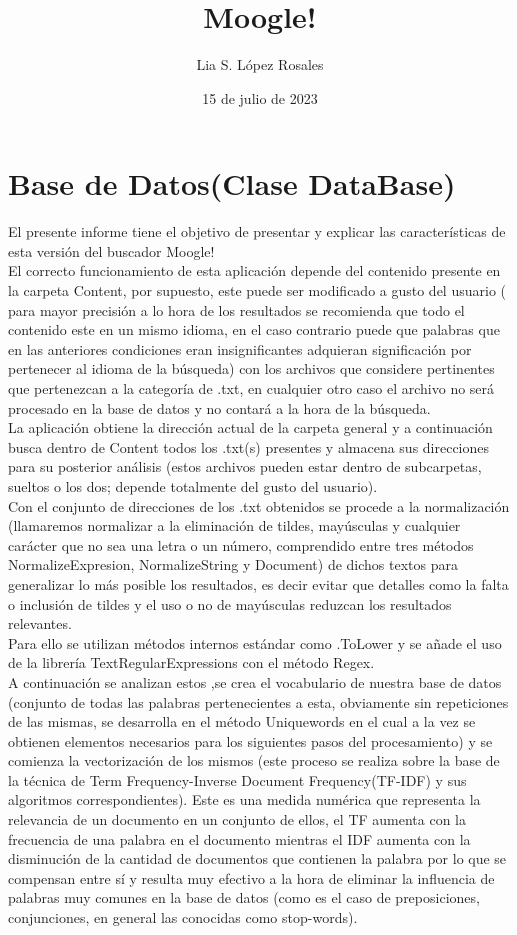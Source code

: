 \documentclass[options]{article}
\title{Moogle!}
\author{Lia S. López Rosales}
\date{15 de julio de 2023}
\begin{document}
\maketitle
\section{Base de Datos(Clase DataBase)}
El presente informe tiene el objetivo de presentar y explicar las características de esta versión del buscador Moogle!\\
El correcto funcionamiento de esta aplicación depende del contenido presente en la carpeta Content, por supuesto, este puede ser modificado a gusto del usuario ( para mayor precisión a lo hora de los resultados se recomienda que todo el contenido este en un mismo idioma, en el caso contrario puede que palabras que en las anteriores condiciones eran insignificantes adquieran significación por pertenecer al idioma de la búsqueda) con los archivos que considere pertinentes que pertenezcan a la categoría de .txt, en cualquier otro caso el archivo no será procesado en la base de datos y no contará a la hora de la búsqueda.\\
La aplicación obtiene la dirección actual de la carpeta general y a continuación busca dentro de Content todos los .txt(s) presentes y almacena sus direcciones para su posterior análisis (estos archivos pueden estar dentro de subcarpetas, sueltos o los dos; depende totalmente del gusto del usuario).\\
Con el conjunto de direcciones de los .txt obtenidos se procede a la normalización (llamaremos normalizar a la eliminación de tildes, mayúsculas y cualquier carácter que no sea una letra o un número, comprendido entre tres métodos NormalizeExpresion, NormalizeString y Document) de dichos textos para generalizar lo más posible los resultados, es decir evitar que detalles como la falta o inclusión de tildes y el uso o no de mayúsculas reduzcan los resultados relevantes.\\
Para ello se utilizan métodos internos estándar como .ToLower y se añade el uso de la librería TextRegularExpressions con el método Regex.\\
A continuación se analizan estos ,se crea el vocabulario de nuestra base de datos (conjunto de todas las palabras pertenecientes a esta, obviamente sin repeticiones de las mismas, se desarrolla en el método Uniquewords en el cual a la vez se obtienen elementos necesarios para los siguientes pasos del procesamiento) y se comienza  la vectorización de los mismos (este proceso se realiza sobre la base de la técnica de  Term Frequency-Inverse Document Frequency(TF-IDF) y sus algoritmos correspondientes). Este es una medida numérica que representa la relevancia de un documento en un conjunto de ellos, el TF aumenta con la frecuencia de una palabra en el documento mientras el IDF aumenta con la disminución de la cantidad de documentos que contienen la palabra por lo que se compensan entre sí y resulta muy efectivo a la hora de eliminar la influencia de palabras muy comunes en la base de datos (como es el caso de preposiciones, conjunciones, en general las conocidas como stop-words).\\
\end{document}
